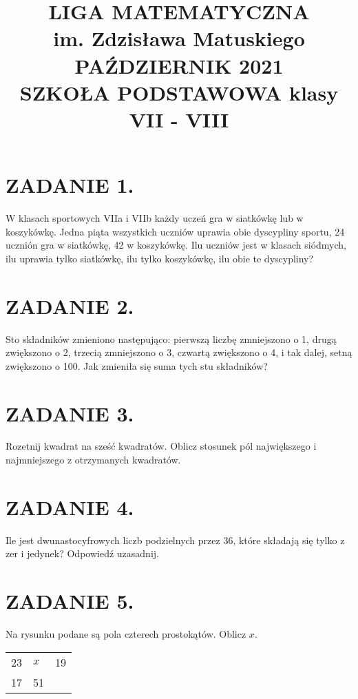 \documentclass[10pt]{article}
\title{LIGA MATEMATYCZNA \\
 im. Zdzisława Matuskiego \\
 PAŹDZIERNIK 2021 \\
 SZKOŁA PODSTAWOWA klasy VII - VIII }
\author{}
\date{}
\begin{document}
\maketitle
\section*{ZADANIE 1.}
W klasach sportowych VIIa i VIIb każdy uczeń gra w siatkówkę lub w koszykówkę. Jedna piąta wszystkich uczniów uprawia obie dyscypliny sportu, 24 ucznión gra w siatkówkę, 42 w koszykówkę. Ilu uczniów jest w klasach siódmych, ilu uprawia tylko siatkówkę, ilu tylko koszykówkę, ilu obie te dyscypliny?

\section*{ZADANIE 2.}
Sto składników zmieniono następująco: pierwszą liczbę zmniejszono o 1, drugą zwiększono o 2, trzecią zmniejszono o 3, czwartą zwiększono o 4, i tak dalej, setną zwiększono o 100. Jak zmieniła się suma tych stu składników?

\section*{ZADANIE 3.}
Rozetnij kwadrat na sześć kwadratów. Oblicz stosunek pól największego i najmniejszego z otrzymanych kwadratów.

\section*{ZADANIE 4.}
Ile jest dwunastocyfrowych liczb podzielnych przez 36, które składają się tylko z zer i jedynek? Odpowiedź uzasadnij.

\section*{ZADANIE 5.}
Na rysunku podane są pola czterech prostokątów. Oblicz \(x\).

\begin{center}
\begin{tabular}{|l|l|l|}
\hline
 &  &  \\
\hline
23 & \(x\) & 19 \\
\hline
17 & 51 &  \\
\hline
\end{tabular}
\end{center}
\end{document}
